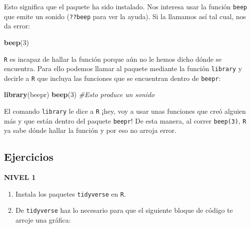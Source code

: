 \documentclass[
]{book}
\newenvironment{Shaded}{\begin{snugshade}}{\end{snugshade}}
\newcommand{\CommentTok}[1]{\textcolor[rgb]{0.56,0.35,0.01}{\textit{#1}}}
\newcommand{\DecValTok}[1]{\textcolor[rgb]{0.00,0.00,0.81}{#1}}
\newcommand{\KeywordTok}[1]{\textcolor[rgb]{0.13,0.29,0.53}{\textbf{#1}}}
\newcommand{\NormalTok}[1]{#1}
\providecommand{\tightlist}{%
  \setlength{\itemsep}{0pt}\setlength{\parskip}{0pt}}
\begin{document}
Esto significa que el paquete ha sido instalado. Nos interesa usar la función \texttt{beep} que emite un sonido (\texttt{??beep} para ver la ayuda). Si la llamamos así tal cual, nos da error:

\begin{Shaded}
\begin{Highlighting}[]
\KeywordTok{beep}\NormalTok{(}\DecValTok{3}\NormalTok{)}
\end{Highlighting}
\end{Shaded}

\texttt{R} es incapaz de hallar la función porque aún no le hemos dicho dónde se encuentra. Para ello podemos llamar al paquete mediante la función \texttt{library} y decirle a \texttt{R} que incluya las funciones que se encuentran dentro de \texttt{beepr}:

\begin{Shaded}
\begin{Highlighting}[]
\KeywordTok{library}\NormalTok{(beepr)}
\KeywordTok{beep}\NormalTok{(}\DecValTok{3}\NormalTok{) }\CommentTok{#Esto produce un sonido}
\end{Highlighting}
\end{Shaded}

El comando \texttt{library} le dice a \texttt{R} ¡hey, voy a usar unas funciones que creó alguien más y que están dentro del paquete \texttt{beepr}! De esta manera, al correr \texttt{beep(3)}, \texttt{R} ya sabe dónde hallar la función y por eso no arroja error.

\hypertarget{ejercicios-1}{%
\subsection{Ejercicios}\label{ejercicios-1}}

\textbf{NIVEL 1}

\begin{enumerate}
\def\labelenumi{\arabic{enumi}.}
\tightlist
\item
  Instala los paquetes \texttt{tidyverse} en \texttt{R}.
\item
  De \texttt{tidyverse} haz lo necesario para que el siguiente bloque de código te arroje una gráfica:
\end{enumerate}
\end{document}
